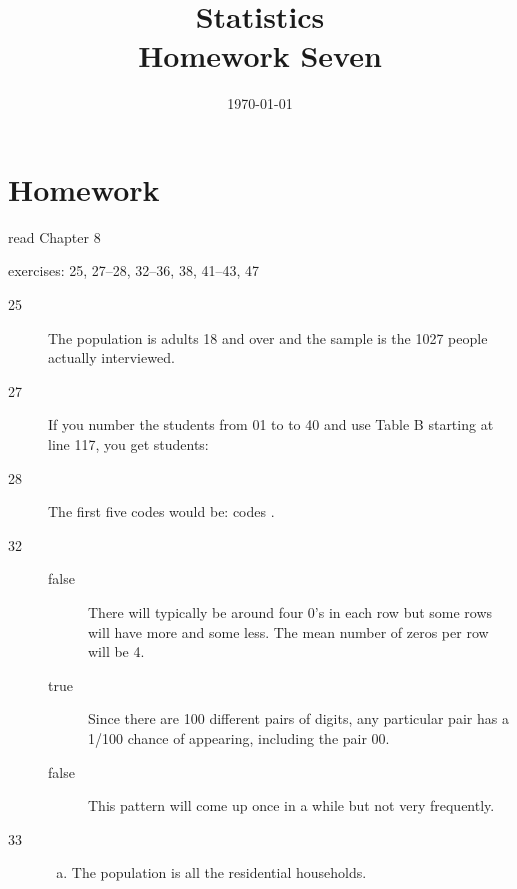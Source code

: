 \documentclass[letterpaper, landscape]{exam}
\title{Statistics \\ Homework Seven}
\date{\today}
\author{}
\begin{document}
  \maketitle

  \section{Homework}
    \begin{itemize*}
      \item read Chapter 8 
      \item exercises: 25, 27--28, 32--36, 38, 41--43, 47
    \end{itemize*}

  \ifprintanswers{}
    \begin{description}

      \item[25] The population is adults 18 and over and the sample is the 1027
        people actually interviewed.

      \item[27] If you number the students from 01 to to 40 and use Table B
        starting at line 117, you get students: 


      \item[28] The first five codes would be: codes 
        .

      \item[32] 
        \begin{description}
          \item[false] There will typically be around four 0's in each row but
            some rows will have more and some less.  The mean number of zeros
            per row will be 4.

          \item[true] Since there are 100 different pairs of digits, any
            particular pair has a 1/100 chance of appearing, including the pair
            00.

          \item[false] This pattern will come up once in a while but not very
            frequently.
        \end{description}

      \item[33]
        \begin{enumerate}[(a)]
          \item The population is all the residential households.


\end{enumerate}
\end{description}
\end{document}
